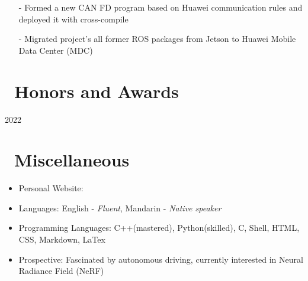\documentclass{resume}
\begin{document}
\begin{itemize}
  \item[-] Formed a new CAN FD program based on Huawei communication rules and deployed it with cross-compile
  \item[-] Migrated project's all former ROS packages from Jetson to Huawei Mobile Data Center (MDC)
\end{itemize}


\section{\faTrophy\ Honors and Awards}
 {2022}

\section{\faCogs\ Miscellaneous}
\begin{itemize}[parsep=0.5ex]
  \item Personal Website: 
  \item Languages: English - \textit{Fluent}, Mandarin - \textit{Native speaker}
  \item Programming Languages: C++(mastered), Python(skilled), C, Shell, HTML, CSS, Markdown, LaTex
  \item Prospective: Fascinated by autonomous driving, currently interested in Neural Radiance Field (NeRF)
\end{itemize}

%
%
\end{document}
